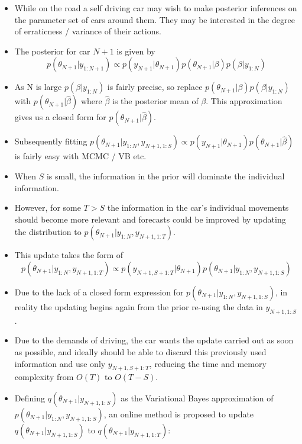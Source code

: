 \documentclass[12pt,a4paper]{article}\usepackage[]{graphicx}\usepackage[]{color}
\begin{document}
\begin{itemize}
\item While on the road a self driving car may wish to make posterior inferences on the parameter set of cars around them. They may be interested in the degree of erraticness / variance of their actions.
\item The posterior for car $N+1$ is given by 
\begin{equation}
p(\theta_{N+1} | y_{1:N+1}) \propto p(y_{N+1} | \theta_{N+1}) p(\theta_{N+1} | \beta) p (\beta | y_{1:N})
\end{equation}
\item As N is large $p (\beta | y_{1:N})$ is fairly precise, so replace $ p(\theta_{N+1} | \beta) p (\beta | y_{1:N})$ with $ p(\theta_{N+1} | \hat{\beta})$ where $\hat{\beta}$ is the posterior mean of $\beta$. This approximation gives us a closed form for $ p(\theta_{N+1} | \hat{\beta})$.
\item Subsequently fitting $p(\theta_{N+1} | y_{1:N}, y_{N+1, 1:S})  \propto p(y_{N+1} | \theta_{N+1}) p(\theta_{N+1} | \hat{\beta})$ is fairly easy with MCMC / VB etc.
\item When $S$ is small, the information in the prior will dominate the individual information.
\item However, for some $T > S$ the information in the car's individual movements should become more relevant and forecasts could be improved by updating the distribution to $p(\theta_{N+1} | y_{1:N}, y_{N+1, 1:T})$.
\item This update takes the form of
\begin{equation}
p(\theta_{N+1} | y_{1:N}, y_{N+1, 1:T}) \propto p(y_{N+1, S+1:T} | \theta_{N+1}) p(\theta_{N+1} | y_{1:N}, y_{N+1, 1:S})
\end{equation}
\item Due to the lack of a closed form expression for $p(\theta_{N+1} | y_{1:N}, y_{N+1, 1:S})$, in reality the updating begins again from the prior re-using the data in $y_{N+1, 1:S}$.
\item Due to the demands of driving, the car wants the update carried out as soon as possible, and ideally should be able to discard this previously used information and use only $y_{N+1, S+1:T}$, reducing the time and memory complexity from $O(T)$ to $O(T-S)$. 
\item Defining $q(\theta_{N+1} | y_{N+1, 1:S})$ as the Variational Bayes approximation of $p(\theta_{N+1} | y_{1:N}, y_{N+1, 1:S})$, an online method is proposed to update $q(\theta_{N+1} | y_{N+1, 1:S})$ to $q(\theta_{N+1} | y_{N+1, 1:T})$:

\end{itemize}
\end{document}
